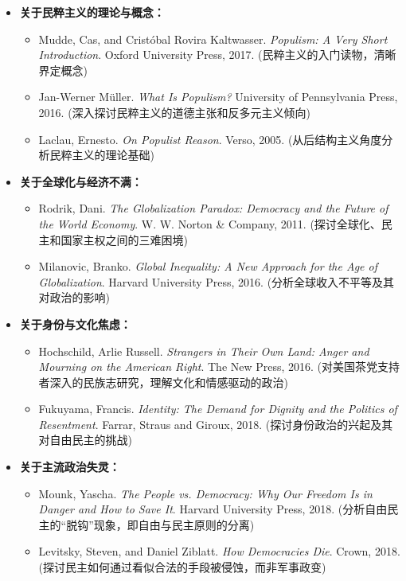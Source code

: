 \begin{itemize}
    \item \textbf{关于民粹主义的理论与概念：}
    \begin{itemize}
        \item Mudde, Cas, and Cristóbal Rovira Kaltwasser. \textit{Populism: A Very Short Introduction}. Oxford University Press, 2017. (民粹主义的入门读物，清晰界定概念)
        \item Jan-Werner Müller. \textit{What Is Populism?} University of Pennsylvania Press, 2016. (深入探讨民粹主义的道德主张和反多元主义倾向)
        \item Laclau, Ernesto. \textit{On Populist Reason}. Verso, 2005. (从后结构主义角度分析民粹主义的理论基础)
    \end{itemize}

    \item \textbf{关于全球化与经济不满：}
    \begin{itemize}
        \item Rodrik, Dani. \textit{The Globalization Paradox: Democracy and the Future of the World Economy}. W. W. Norton \& Company, 2011. (探讨全球化、民主和国家主权之间的三难困境)
        \item Milanovic, Branko. \textit{Global Inequality: A New Approach for the Age of Globalization}. Harvard University Press, 2016. (分析全球收入不平等及其对政治的影响)
    \end{itemize}

    \item \textbf{关于身份与文化焦虑：}
    \begin{itemize}
        \item Hochschild, Arlie Russell. \textit{Strangers in Their Own Land: Anger and Mourning on the American Right}. The New Press, 2016. (对美国茶党支持者深入的民族志研究，理解文化和情感驱动的政治)
        \item Fukuyama, Francis. \textit{Identity: The Demand for Dignity and the Politics of Resentment}. Farrar, Straus and Giroux, 2018. (探讨身份政治的兴起及其对自由民主的挑战)
    \end{itemize}

    \item \textbf{关于主流政治失灵：}
    \begin{itemize}
        \item Mounk, Yascha. \textit{The People vs. Democracy: Why Our Freedom Is in Danger and How to Save It}. Harvard University Press, 2018. (分析自由民主的“脱钩”现象，即自由与民主原则的分离)
        \item Levitsky, Steven, and Daniel Ziblatt. \textit{How Democracies Die}. Crown, 2018. (探讨民主如何通过看似合法的手段被侵蚀，而非军事政变)
    \end{itemize}


\end{itemize}
